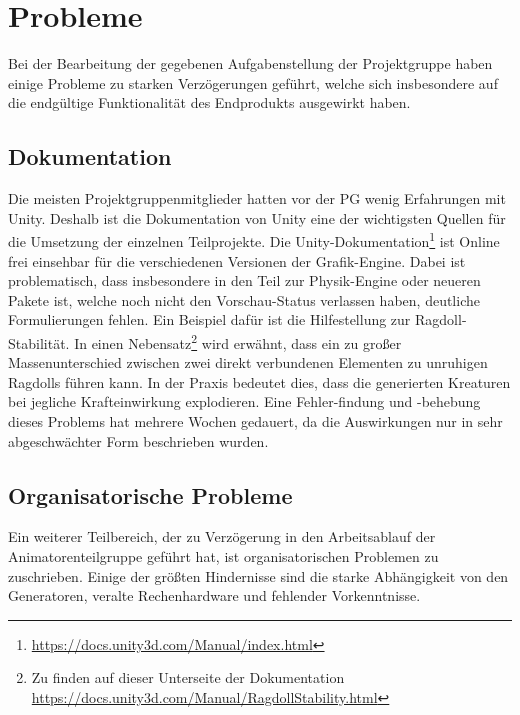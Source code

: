 \chapter{Probleme}
\label{Probleme}
Bei der Bearbeitung der gegebenen Aufgabenstellung der Projektgruppe haben einige Probleme zu starken Verzögerungen geführt, welche sich insbesondere auf die endgültige Funktionalität des Endprodukts ausgewirkt haben.

\section{Dokumentation} %
Die meisten Projektgruppenmitglieder hatten vor der PG wenig Erfahrungen mit Unity. Deshalb ist die Dokumentation von Unity eine der wichtigsten Quellen für die Umsetzung der einzelnen Teilprojekte. Die Unity-Dokumentation\footnote{\url{https://docs.unity3d.com/Manual/index.html}} ist Online frei einsehbar für die verschiedenen Versionen der Grafik-Engine. Dabei ist problematisch, dass insbesondere in den Teil zur Physik-Engine oder neueren Pakete ist, welche noch nicht den Vorschau-Status verlassen haben, deutliche Formulierungen fehlen. Ein Beispiel dafür ist die Hilfestellung zur Ragdoll-Stabilität. In einen Nebensatz\footnote{Zu finden auf dieser Unterseite der Dokumentation \url{https://docs.unity3d.com/Manual/RagdollStability.html}} wird erwähnt, dass ein zu großer Massenunterschied zwischen zwei direkt verbundenen Elementen zu unruhigen Ragdolls führen kann. In der Praxis bedeutet dies, dass die generierten Kreaturen bei jegliche Krafteinwirkung explodieren. Eine Fehler-findung und -behebung dieses Problems hat mehrere Wochen gedauert, da die Auswirkungen nur in sehr abgeschwächter Form beschrieben wurden.


\section{Organisatorische Probleme}
Ein weiterer Teilbereich, der zu Verzögerung in den Arbeitsablauf der Animatorenteilgruppe geführt hat, ist organisatorischen Problemen zu zuschrieben. Einige der größten Hindernisse sind die starke Abhängigkeit von den Generatoren, veralte Rechenhardware und fehlender Vorkenntnisse.

